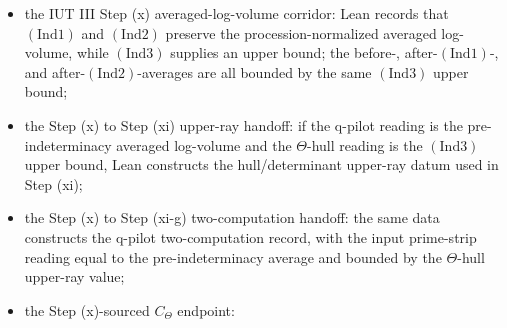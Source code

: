 \documentclass[11pt]{article}
\begin{document}
\begin{itemize}
  Lean separately proves that raw \(F_\ell\)-coordinate sums are invariant
  under additive translation, unit multiplication, and their affine
  composition; this is only finite-permutation invariance and does not supply
  descent to \(|F_\ell|\).  For the Gaussian coordinate average, Lean packages
  this as a diagnostic: every affine map with nonzero additive offset preserves
  the raw coordinate average but fails full-label descent.  If the Gaussian
  environment degree is nonzero, the same affine operation also changes the
  zero Gaussian component, so aggregate average invariance is not pointwise
  Gaussian compatibility.  Lean also proves the exact degeneracy criterion:
  a coordinate Gaussian component is zero if and only if its coordinate is zero
  or the environment degree is zero; for an affine zero-coordinate image this
  becomes \(t=0\) or \(\deg(q)=0\).
  At the purely labelwise level, Lean proves the exact pointwise preservation
  criterion: \(j\mapsto a j+t\) preserves the full absolute label of every
  coordinate if and only if \(t=0\) and \(a\in\{\pm1\}\).
  At the Gaussian-value level, Lean proves the exact nondegenerate pointwise
  criterion: if the environment degree is nonzero, then
  \(j\mapsto a j+t\) preserves all coordinate Gaussian degrees if and only if
  \(t=0\) and \(a\in\{\pm1\}\).
  Lean also converts the
  zero/nonzero cusp-label compatibility object to a uniform \(F_\ell\) average
  and proves that a diagonal constant log-volume distribution averages to that
  same constant;
\item the IUT III Step (x) averaged-log-volume corridor:
  Lean records that \((\mathrm{Ind1})\) and \((\mathrm{Ind2})\) preserve the
  procession-normalized averaged log-volume, while \((\mathrm{Ind3})\) supplies
  an upper bound; the before-, after-\((\mathrm{Ind1})\)-, and
  after-\((\mathrm{Ind2})\)-averages are all bounded by the same
  \((\mathrm{Ind3})\) upper bound;
\item the Step (x) to Step (xi) upper-ray handoff:
  if the q-pilot reading is the pre-indeterminacy averaged log-volume and the
  \(\Theta\)-hull reading is the \((\mathrm{Ind3})\) upper bound, Lean constructs
  the hull/determinant upper-ray datum used in Step (xi);
\item the Step (x) to Step (xi-g) two-computation handoff:
  the same data constructs the q-pilot two-computation record, with the input
  prime-strip reading equal to the pre-indeterminacy average and bounded by the
  \(\Theta\)-hull upper-ray value;
\item the Step (x)-sourced \(C_\Theta\) endpoint:

\end{itemize}
\end{document}
